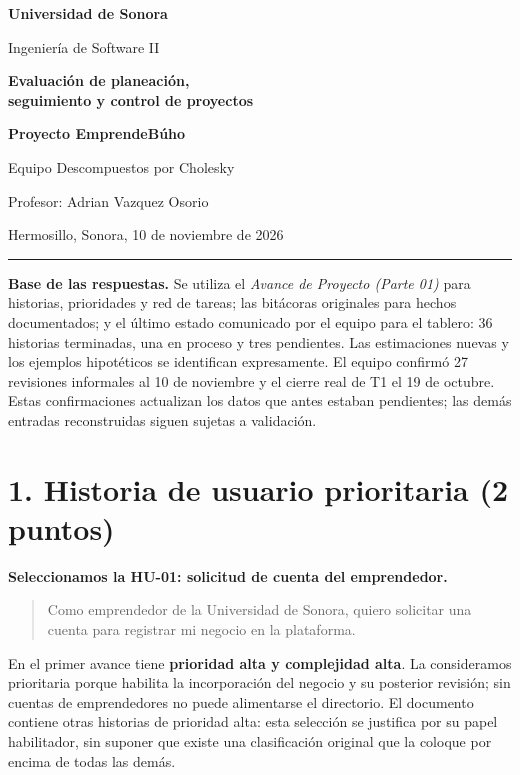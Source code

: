 \documentclass[11pt,letterpaper]{article}
\newcommand{\hu}[1]{\mbox{HU-#1}}
\begin{document}
\begin{center}
{\Large\bfseries Universidad de Sonora}\par
{\large Ingeniería de Software II}\par
\vspace{0.3cm}
{\LARGE\bfseries\color{marino} Evaluación de planeación,\\
seguimiento y control de proyectos}\par
\vspace{0.25cm}
{\large\bfseries Proyecto EmprendeBúho}\par
Equipo \guillemotleft Descompuestos por Cholesky\guillemotright\par
Profesor: Adrian Vazquez Osorio\par
Hermosillo, Sonora, 10 de noviembre de 2026
\end{center}
\hrule

\textbf{Base de las respuestas.} Se utiliza el \textit{Avance de Proyecto
(Parte 01)} para historias, prioridades y red de tareas; las bitácoras
originales para hechos documentados; y el último estado comunicado por el
equipo para el tablero: 36 historias terminadas, una en proceso y tres
pendientes. Las estimaciones nuevas y los ejemplos hipotéticos se identifican
expresamente. El equipo confirmó 27 revisiones informales al 10 de noviembre
y el cierre real de T1 el 19 de octubre. Estas confirmaciones actualizan los
datos que antes estaban pendientes; las demás entradas reconstruidas siguen
sujetas a validación.

\section*{1. Historia de usuario prioritaria (2 puntos)}
\textbf{Seleccionamos la \hu{01}: solicitud de cuenta del emprendedor.}

\begin{quote}
Como emprendedor de la Universidad de Sonora, quiero solicitar una cuenta
para registrar mi negocio en la plataforma.
\end{quote}

En el primer avance tiene \textbf{prioridad alta y complejidad alta}. La
consideramos prioritaria porque habilita la incorporación del negocio y su
posterior revisión; sin cuentas de emprendedores no puede alimentarse el
directorio. El documento contiene otras historias de prioridad alta: esta
selección se justifica por su papel habilitador, sin suponer que existe una
clasificación original que la coloque por encima de todas las demás.
\end{document}
